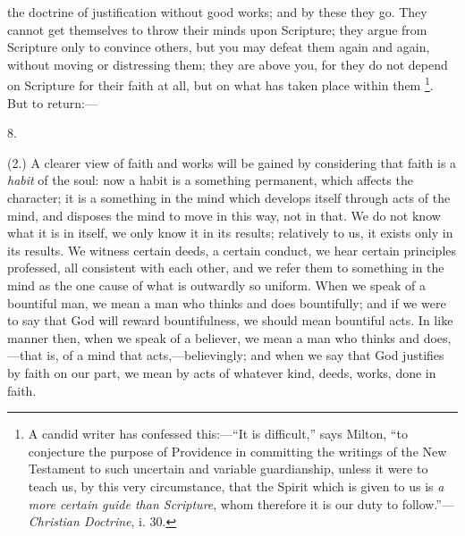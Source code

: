 the doctrine of justification without good works; and by these they
go. They cannot get themselves to throw their minds upon Scripture;
they argue from Scripture only to convince others, but you may defeat
them again and again, without moving or distressing them; they are
above you, for they do not depend on Scripture for their faith
at all, but on what has taken place within them \footnote{A candid writer
has confessed this:—``It is difficult,'' says Milton,
``to conjecture the purpose of Providence in committing the
writings of the New Testament to such uncertain and variable
guardianship, unless it were to teach us, by this very circumstance,
that the Spirit which is given to us is \emph{a more certain guide than
Scripture}, whom therefore it is our duty to follow.''—\emph{Christian
Doctrine}, i. 30.}. But to return:—

8.

(2.) A clearer view of faith and works will be gained by
considering that faith is a \emph{habit} of the soul: now a habit is a
something permanent, which affects the character; it is a something in
the mind which develops itself through acts of the mind, and disposes
the mind to move in this way, not in that. We do not know what it is
in itself, we only know it in its results; relatively to us, it exists
only in its results. We witness certain deeds, a certain conduct, we
hear certain principles professed, all consistent with each other, and
we refer them to something in the mind as the one cause of what is
outwardly so uniform. When we speak of a bountiful man, we mean a man
who thinks and does bountifully; and if we were to say that God will
reward bountifulness, we should mean bountiful acts. In like manner
then, when we speak of a believer, we mean a man who thinks and does,—that
is, of a mind that acts,—believingly; and when we say that God
justifies by faith on our part, we mean by acts of whatever kind,
deeds, works, done in faith.

